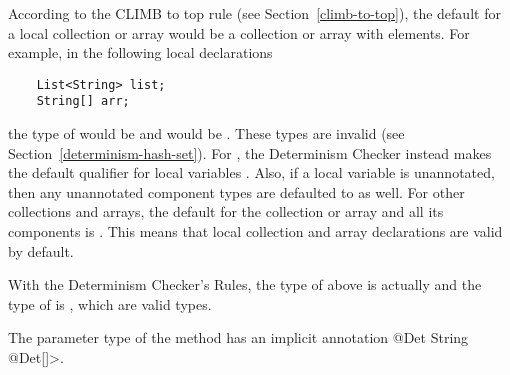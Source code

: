 According to the CLIMB to top rule (see Section~\ref{climb-to-top}), the default
for a local collection or array would be a  collection or array
with  elements. For example, in the following local declarations
\begin{Verbatim}
    List<String> list;
    String[] arr;
\end{Verbatim}
the type of  would be  and
 would be . These types are invalid (see
Section~\ref{determinism-hash-set}). For , the Determinism Checker
instead makes the default qualifier for local variables . Also, if a local
 variable is unannotated, then any unannotated component types are
defaulted to  as well. For other collections and arrays, the default
for the collection or array and all its components is . This means
that local collection and array declarations are valid by default.

With the Determinism Checker's Rules, the type of  above is actually
 and the type of  is , which are valid types.

The parameter type of the  method has an implicit annotation
\<@Det String @Det[]>.

